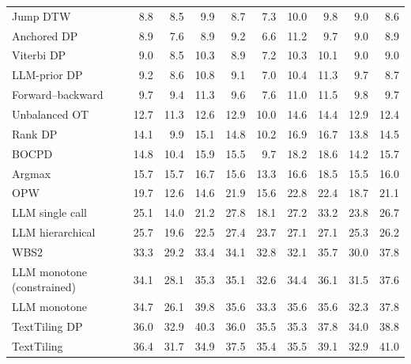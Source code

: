\begin{table}[t]
\begin{tabular*}{\linewidth}{@{\extracolsep{\fill}}lrrrrrrrrr@{}}
Jump DTW & 8.8 & 8.5 & 9.9 & 8.7 & 7.3 & 10.0 & 9.8 & 9.0 & 8.6 \\
Anchored DP & 8.9 & 7.6 & 8.9 & 9.2 & 6.6 & 11.2 & 9.7 & 9.0 & 8.9 \\
Viterbi DP & 9.0 & 8.5 & 10.3 & 8.9 & 7.2 & 10.3 & 10.1 & 9.0 & 9.0 \\
LLM-prior DP & 9.2 & 8.6 & 10.8 & 9.1 & 7.0 & 10.4 & 11.3 & 9.7 & 8.7 \\
Forward--backward & 9.7 & 9.4 & 11.3 & 9.6 & 7.6 & 11.0 & 11.5 & 9.8 & 9.7 \\
Unbalanced OT & 12.7 & 11.3 & 12.6 & 12.9 & 10.0 & 14.6 & 14.4 & 12.9 & 12.4 \\
Rank DP & 14.1 & 9.9 & 15.1 & 14.8 & 10.2 & 16.9 & 16.7 & 13.8 & 14.5 \\
BOCPD & 14.8 & 10.4 & 15.9 & 15.5 & 9.7 & 18.2 & 18.6 & 14.2 & 15.7 \\
Argmax & 15.7 & 15.7 & 16.7 & 15.6 & 13.3 & 16.6 & 18.5 & 15.5 & 16.0 \\
OPW & 19.7 & 12.6 & 14.6 & 21.9 & 15.6 & 22.8 & 22.4 & 18.7 & 21.1 \\
LLM single call & 25.1 & 14.0 & 21.2 & 27.8 & 18.1 & 27.2 & 33.2 & 23.8 & 26.7 \\
LLM hierarchical & 25.7 & 19.6 & 22.5 & 27.4 & 23.7 & 27.1 & 27.1 & 25.3 & 26.2 \\
WBS2 & 33.3 & 29.2 & 33.4 & 34.1 & 32.8 & 32.1 & 35.7 & 30.0 & 37.8 \\
LLM monotone (constrained) & 34.1 & 28.1 & 35.3 & 35.1 & 32.6 & 34.4 & 36.1 & 31.5 & 37.6 \\
LLM monotone & 34.7 & 26.1 & 39.8 & 35.6 & 33.3 & 35.6 & 35.6 & 32.3 & 37.8 \\
TextTiling DP & 36.0 & 32.9 & 40.3 & 36.0 & 35.5 & 35.3 & 37.8 & 34.0 & 38.8 \\
TextTiling & 36.4 & 31.7 & 34.9 & 37.5 & 35.4 & 35.5 & 39.1 & 32.9 & 41.0 \\
\bottomrule
\end{tabular*}
\end{table}
